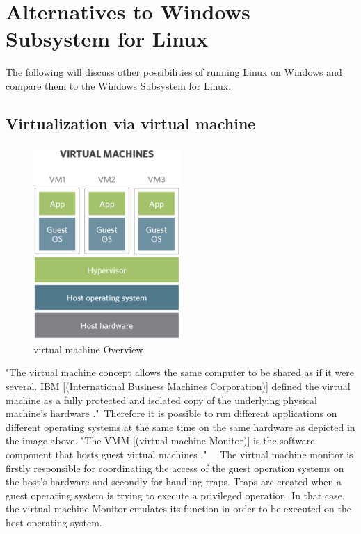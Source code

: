 \documentclass[utf8,biblatex, ngerman, english]{lni}
\begin{document}
\section{Alternatives to Windows Subsystem for Linux}
The following will discuss other possibilities of running Linux on Windows and compare them to the Windows Subsystem for Linux.

\subsection{Virtualization via virtual machine}

\begin{figure}
  \centering
  \includegraphics[width=0.5\textwidth]{VM.pdf}
  \caption{virtual machine Overview}
  \label{img:vm}
\end{figure}


"The virtual machine concept allows the same computer to be shared as if it were several. IBM [(International Business Machines Corporation)] defined the virtual machine as a fully protected and isolated copy of the underlying physical machine’s hardware \cite[p. 2]{Ro01}."\ 
Therefore it is possible to run different applications on different operating systems at the same time on the same hardware as depicted in the image above. "The VMM [(virtual machine Monitor)] is the software component that hosts guest virtual machines \cite[p. 3]{Ro01}." \ \ The virtual machine monitor is firstly responsible for coordinating the access of the guest operation systems on the host's hardware and secondly for handling traps. Traps are created when a guest operating system is trying to execute a privileged operation. In that case, the virtual machine Monitor emulates its function in order to be executed on the host operating system.
\end{document}
